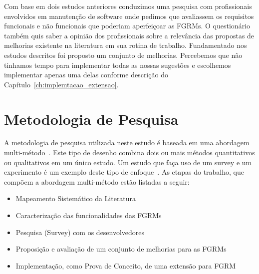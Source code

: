 Com base em dois estudos anteriores conduzimos uma pesquisa com profissionais
envolvidos em manutenção de software onde pedimos que avaliassem os requisitos
funcionais e não funcionais que poderiam aperfeiçoar as FGRMs. O questionário
também quis saber a opinião dos profissionais sobre a relevância das propostas
de me\-lho\-ri\-as existente na literatura em sua rotina de trabalho.
Fundamentado nos estudos descritos foi proposto um conjunto de melhorias.
Percebemos que não tinhamos tempo para implementar todas as nossas sugestões e
escolhemos implementar apenas uma delas conforme descrição do
Capítulo~\ref{ch:implemtacao_extensao}.

\section{Metodologia de Pesquisa}
\label{sec:intro-metodologia}


A metodologia de pesquisa utilizada neste estudo é baseada em uma abordagem
multi-método~\cite{hesse2010mixed}. Este tipo de desenho combina dois ou mais
métodos quantitativos ou qualitativos em um único estudo. Um estudo que faça uso
de um survey e um experimento é um exemplo deste tipo de
enfoque~\cite{hesse2010mixed}. As etapas do trabalho, que compõem a abordagem
multi-método estão listadas a seguir:

\begin{itemize}[(i)]
	\item Mapeamento Sistemático da Literatura~\cite{Petersen2008}
	\item Caracterização das funcionalidades das FGRMs
	\item Pesquisa (Survey) com os
		desenvolvedores~\cite{wohlin2012experimentation}
	\item Proposição e avaliação de um conjunto de melhorias para as FGRMs
    \item Implementação, como Prova de Conceito, de uma extensão para FGRM
\end{itemize}

